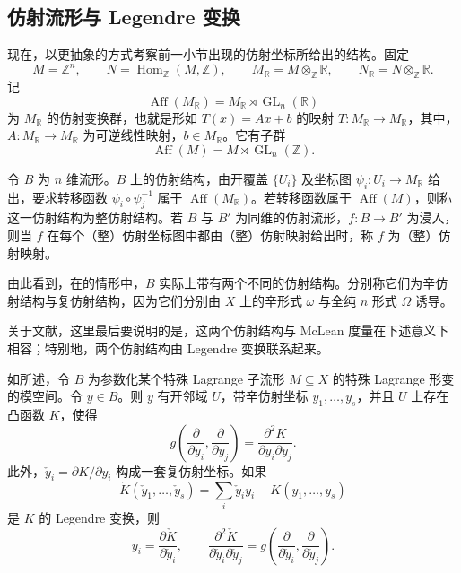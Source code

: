 \subsection{仿射流形与 Legendre 变换}\label{sec:6.1.2}

现在，以更抽象的方式考察前一小节出现的仿射坐标所给出的结构。固定
\[
M=\mathbb Z^n,\qquad N=\operatorname{Hom}_{\mathbb Z}(M,\mathbb Z),
\qquad M_{\mathbb R}=M\otimes_{\mathbb Z}\mathbb R,
\qquad N_{\mathbb R}=N\otimes_{\mathbb Z}\mathbb R.
\]
记
\[
\operatorname{Aff}(M_{\mathbb R})
=M_{\mathbb R}\rtimes\operatorname{GL}_n(\mathbb R)
\]
为 $M_{\mathbb R}$ 的仿射变换群，也就是形如 $T(x)=Ax+b$ 的映射 $T\colon M_{\mathbb R}\to M_{\mathbb R}$，其中，$A\colon M_{\mathbb R}\to M_{\mathbb R}$ 为可逆线性映射，$b\in M_{\mathbb R}$。它有子群
\[
\operatorname{Aff}(M)=M\rtimes\operatorname{GL}_n(\mathbb Z).
\]

\begin{definition}\label{def:6.3}
令 $B$ 为 $n$ 维流形。$B$ 上的仿射结构，由开覆盖 $\{U_i\}$ 及坐标图 $\psi_i\colon U_i\to M_{\mathbb R}$ 给出，要求转移函数 $\psi_i\circ\psi_j^{-1}$ 属于 $\operatorname{Aff}(M_{\mathbb R})$。若转移函数属于 $\operatorname{Aff}(M)$，则称这一仿射结构为整仿射结构。若 $B$ 与 $B'$ 为同维的仿射流形，$f\colon B\to B'$ 为浸入，则当 $f$ 在每个（整）仿射坐标图中都由（整）仿射映射给出时，称 $f$ 为（整）仿射映射。
\end{definition}

由此看到，在的情形中，$B$ 实际上带有两个不同的仿射结构。分别称它们为辛仿射结构与复仿射结构，因为它们分别由 $X$ 上的辛形式 $\omega$ 与全纯 $n$ 形式 $\Omega$ 诱导。

关于文献，这里最后要说明的是，这两个仿射结构与 McLean 度量在下述意义下相容；特别地，两个仿射结构由 Legendre 变换联系起来。

\begin{proposition}\label{prop:6.4}
如所述，令 $B$ 为参数化某个特殊 Lagrange 子流形 $M\subseteq X$ 的特殊 Lagrange 形变的模空间。令 $y\in B$。则 $y$ 有开邻域 $U$，带辛仿射坐标 $y_1,\ldots,y_s$，并且 $U$ 上存在凸函数 $K$，使得
\[
g\!\left(\frac{\partial}{\partial y_i},\frac{\partial}{\partial y_j}\right)
=\frac{\partial^2K}{\partial y_i\partial y_j}.
\]
此外，$\check y_i=\partial K/\partial y_i$ 构成一套复仿射坐标。如果
\[
\check K(\check y_1,\ldots,\check y_s)
=\sum_i\check y_i y_i-K(y_1,\ldots,y_s)
\]
是 $K$ 的 Legendre 变换，则
\[
y_i=\frac{\partial\check K}{\partial\check y_i},
\qquad
\frac{\partial^2\check K}{\partial\check y_i\partial\check y_j}
=g\!\left(\frac{\partial}{\partial\check y_i},\frac{\partial}{\partial\check y_j}\right).
\]
\end{proposition}

